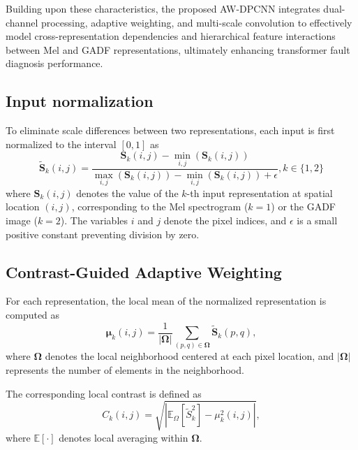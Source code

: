 \documentclass[anonymous]{iopjournal}
\begin{document}
Building upon these characteristics, the proposed AW-DPCNN integrates dual-channel processing, adaptive weighting, and multi-scale convolution to effectively model cross-representation dependencies and hierarchical feature interactions between Mel and GADF representations, ultimately enhancing transformer fault diagnosis performance.

\subsection{Input normalization}
To eliminate scale differences between two representations, each input is first normalized to the interval $[0,1]$ as
\begin{equation}
	\boldsymbol{\tilde{S}}_k(i,j) = \frac{\boldsymbol{S}_k(i,j) - \min\limits_{i,j} (\boldsymbol{S}_k(i,j))}{\max\limits_{i,j} (\boldsymbol{S}_k(i,j)) - \min\limits_{i,j} (\boldsymbol{S}_k(i,j)) + \epsilon}, k\in\{1,2\}
	\label{eq:normalization}
\end{equation}
where $\boldsymbol{S}_k(i,j)$ denotes the value of the $k$-th input representation at spatial location $(i,j)$, corresponding to the Mel spectrogram ($k=1$) or the GADF image ($k=2$). The variables $i$ and $j$ denote the pixel indices, and $\epsilon$ is a small positive constant preventing division by zero.

\subsection{Contrast-Guided Adaptive Weighting}
For each representation, the local mean of the normalized representation is computed as
\begin{equation}
	\boldsymbol{\mu}_k(i,j) = \frac{1}{|\boldsymbol{\Omega}|}
	\sum_{(p,q)\in \boldsymbol{\Omega}} \boldsymbol{\tilde{S}}_k(p,q),
	\label{eq:local_mean}
\end{equation}
where $\boldsymbol{\Omega}$ denotes the local neighborhood centered at each pixel location, and $|\boldsymbol{\Omega}|$ represents the number of elements in the neighborhood.

The corresponding local contrast is defined as
\begin{equation}
	C_k(i,j) = \sqrt{ \left| \mathbb{E}_\Omega \left[ \tilde{S}_k^2 \right] - \mu_k^2(i,j) \right| },
	\label{eq:eq:local_contrast}
\end{equation}
where $\mathbb{E}[\cdot]$ denotes local averaging within $\boldsymbol{\Omega}$.
\end{document}
